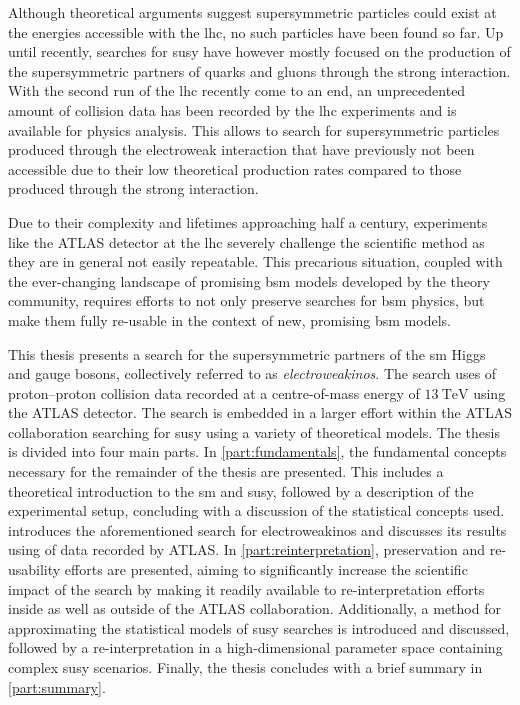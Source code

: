 Although theoretical arguments suggest supersymmetric particles could exist at the energies accessible with the \gls{lhc}, no such particles have been found so far. Up until recently, searches for \gls{susy} have however mostly focused on the production of the supersymmetric partners of quarks and gluons through the strong interaction. With the second run of the \gls{lhc} recently come to an end, an unprecedented amount of collision data has been recorded by the \gls{lhc} experiments and is available for physics analysis. This allows to search for supersymmetric particles produced through the electroweak interaction that have previously not been accessible due to their low theoretical production rates compared to those produced through the strong interaction.

Due to their complexity and lifetimes approaching half a century, experiments like the ATLAS detector at the \gls{lhc} severely challenge the scientific method as they are in general not easily repeatable. This precarious situation, coupled with the ever-changing landscape of promising \gls{bsm} models developed by the theory community, requires efforts to not only preserve searches for \gls{bsm} physics, but make them fully re-usable in the context of new, promising \gls{bsm} models. 

This thesis presents a search for the supersymmetric partners of the \gls{sm} Higgs and gauge bosons, collectively referred to as \textit{electroweakinos}. The search uses \onethirtynineifb of proton--proton collision data recorded at a centre-of-mass energy of $\SI{13}{\TeV}$ using the ATLAS detector. The search is embedded in a larger effort within the ATLAS collaboration searching for \gls{susy} using a variety of theoretical models. The thesis is divided into four main parts. In \cref{part:fundamentals}, the fundamental concepts necessary for the remainder of the thesis are presented. This includes a theoretical introduction to the \gls{sm} and \gls{susy}, followed by a description of the experimental setup, concluding with a discussion of the statistical concepts used.  introduces the aforementioned search for electroweakinos and discusses its results using \onethirtynineifb of data recorded by ATLAS. In \cref{part:reinterpretation}, preservation and re-usability efforts are presented, aiming to significantly increase the scientific impact of the search by making it readily available to re-interpretation efforts inside as well as outside of the ATLAS collaboration. Additionally, a method for approximating the statistical models of \gls{susy} searches is introduced and discussed, followed by a re-interpretation in a high-dimensional parameter space containing complex \gls{susy} scenarios. Finally, the thesis concludes with a brief summary in \cref{part:summary}.


